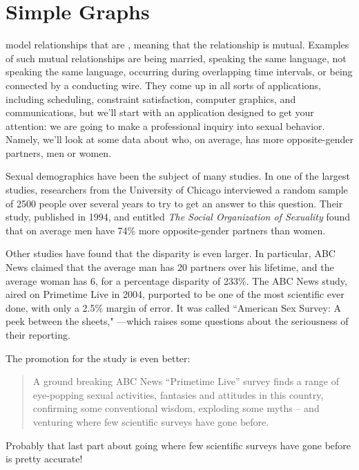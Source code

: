 \chapter{Simple Graphs}\label{simple_graphs_chap}

 model relationships that are
\emph{}, meaning that the relationship is mutual.
Examples of such mutual relationships are being married, speaking the
same language, not speaking the same language, occurring during
overlapping time intervals, or being connected by a conducting wire.
They come up in all sorts of applications, including scheduling,
constraint satisfaction, computer graphics, and communications, but
we'll start with an application designed to get your attention: we are
going to make a professional inquiry into sexual behavior.  Namely,
we'll look at some data about who, on average, has more
opposite-gender partners, men or women.

\iffalse
An example is shown in
Figure~\ref{fig:graph-example}.  The dots are called \emph{nodes} (or
\emph{vertices}) and the lines are called \emph{edges}.
\fi

Sexual demographics have been the subject of many studies.  In one of
the largest studies, researchers from the University of Chicago
interviewed a random sample of 2500 people over several years to try
to get an answer to this question.  Their study, published in 1994,
and entitled \emph{The Social Organization of Sexuality} found that on
average men have 74\% more opposite-gender partners than women.

Other studies have found that the disparity is even larger.  In
particular, ABC News claimed that the average man has 20 partners over his
lifetime, and the average woman has 6, for a percentage disparity of
233\%.  The ABC News study, aired on Primetime Live in 2004, purported to
be one of the most scientific ever done, with only a 2.5\% margin of
error.  It was called ``American Sex Survey: A peek between the sheets,"
---which raises some questions about the seriousness of their reporting.
\begin{editingnotes}
The promotion for the study is even better:
\begin{quote} 
A ground breaking ABC News ``Primetime Live'' survey finds a range of
eye-popping sexual activities, fantasies and attitudes in this country,
confirming some conventional wisdom, exploding some myths -- and venturing
where few scientific surveys have gone before.
\end{quote}
Probably that last part about going where few scientific surveys have gone
before is pretty accurate!
\end{editingnotes}

